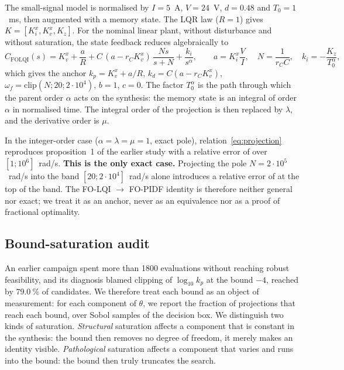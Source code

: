The small-signal model is normalised by $I=5$~A, $V=24$~V, $d=0.48$ and
$T_0=1$~ms, then augmented with a memory state. The LQR law ($R=1$) gives
$K=[K_i^x,K_v^x,K_z]$. For the nominal linear plant, without disturbance and
without saturation, the state feedback reduces algebraically to
\begin{equation}
C_\mathrm{FOLQI}(s)=K_v^x+\frac{a}{R}
+C\,(a-r_CK_v^x)\,\frac{N s}{s+N}
+\frac{k_i}{s^\alpha},\qquad
a=K_i^x\frac{V}{I},\quad N=\frac{1}{r_CC},\quad k_i=-\frac{K_z}{T_0^{\alpha}},
\label{eq:projection}
\end{equation}
which gives the anchor $k_p=K_v^x+a/R$, $k_d=C(a-r_CK_v^x)$,
$\omega_f=\mathrm{clip}(N;20;2\cdot10^4)$, $b=1$, $c=0$. The factor
$T_0^{\alpha}$ is the path through which the parent order $\alpha$ acts on the
synthesis: the memory state is an integral of order $\alpha$ in normalised
time. The integral order of the projection is then replaced by $\lambda$,
and the derivative order is $\mu$.

In the integer-order case ($\alpha=\lambda=\mu=1$, exact pole),
relation~\eqref{eq:projection} reproduces proposition~1 of the earlier study
with a relative error of \ChiffreErreurPropUn{} over $[1;10^6]$~rad/s.
\textbf{This is the only exact case.} Projecting the pole
$N=2\cdot10^5$~rad/s into the band $[20;2\cdot10^4]$~rad/s alone introduces
a relative error of \ChiffreErreurProjPole{} at the top of the band. The
FO-LQI $\to$ FO-PIDF identity is therefore neither general nor exact; we
treat it as an anchor, never as an equivalence nor as a proof of fractional
optimality.

\subsection{Bound-saturation audit}

An earlier campaign spent more than 1800 evaluations without reaching robust
feasibility, and its diagnosis blamed clipping of $\log_{10}k_p$ at the bound
$-4$, reached by $79.0~\%$ of candidates. We therefore treat each bound as an
object of measurement: for each component of $\theta$, we report the
fraction of projections that reach each bound, over \ChiffreAuditN{} Sobol
samples of the decision box. We distinguish two kinds of saturation.
\emph{Structural} saturation affects a component that is constant in the
synthesis: the bound then removes no degree of freedom, it merely makes an
identity visible. \emph{Pathological} saturation affects a component that
varies and runs into the bound: the bound then truly truncates the search.

